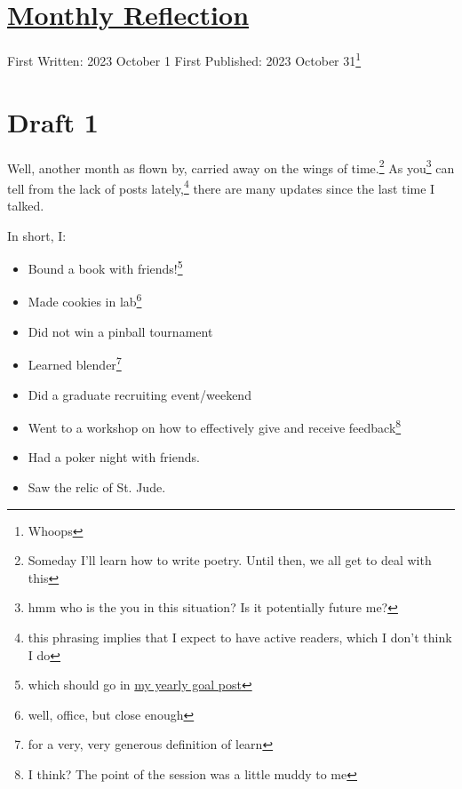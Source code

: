 \documentclass[12pt]{article}[titlepage]
\renewcommand{\,}{\textsuperscript{,}}
\begin{document}
\doublespacing
\section{\href{reflection-september-23.html}{Monthly Reflection}}
First Written: 2023 October 1
First Published: 2023 October 31\footnote{Whoops}

\section{Draft 1}
Well, another month as flown by, carried away on the wings of time.\footnote{Someday I'll learn how to write poetry.
Until then, we all get to deal with this}
As you\footnote{hmm who is the you in this situation? Is it potentially future me?} can tell from the lack of posts lately,\footnote{this phrasing implies that I expect to have active readers, which I don't think I do} there are many updates since the last time I talked.

In short, I:
\begin{itemize}
\item Bound a book with friends!\footnote{which should go in \href{twenty-five}{my yearly goal post}}
\item Made cookies in lab\footnote{well, office, but close enough}
\item Did not win a pinball tournament
\item Learned blender\footnote{for a very, very generous definition of learn}
\item Did a graduate recruiting event/weekend
\item Went to a workshop on how to effectively give and receive feedback\footnote{I think? The point of the session was a little muddy to me}
\item Had a poker night with friends.
\item Saw the relic of St. Jude.
\end{itemize}
\end{document}
